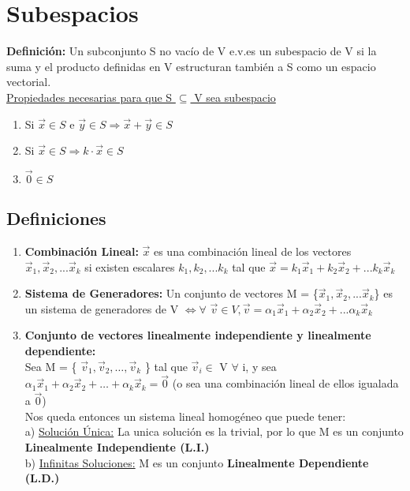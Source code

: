 \documentclass[11pt]{article}
\begin{document}
\section{Subespacios} 
{\bfseries Definición:} Un subconjunto S no vacío de V e.v.es un subespacio de V si la suma y el producto definidas en  V estructuran también a S como un espacio vectorial. \\
\underline {Propiedades necesarias para que S $\subseteq$ V sea subespacio}
\begin{enumerate}
\item Si $\vec{x} \in S$ e $\vec{y} \in S \Rightarrow \vec{x} + \vec{y} \in S$
\item Si $\vec{x} \in S \Rightarrow k \cdot \vec{x} \in S$
\item $\vec{0} \in S$
\end{enumerate}
\subsection{Definiciones}
\begin{enumerate}
\item {\bfseries Combinación Lineal:} $\vec{x}$ es una combinación lineal de los vectores $\vec{x}_{1}, \vec{x}_2,... \vec{x}_k $ si existen escalares $k_{1}, k_{2},... k_{k} $ tal que $\vec{x} = k_{1}\vec{x}_{1} + k_{2}\vec{x}_{2} +... k_{k}\vec{x}_{k}$
\item {\bfseries Sistema de Generadores:} Un conjunto de vectores M = \{$\vec{x}_{1}, \vec{x}_2,... \vec{x}_k $\} es un sistema de generadores de V $\Leftrightarrow \forall $ $ \vec{v} \in V, \vec{v} = \alpha_{1}\vec{x}_{1} + \alpha_{2}\vec{x}_{2} +... \alpha_{k}\vec{x}_{k}$
\item {\bfseries Conjunto de vectores linealmente independiente y linealmente dependiente:}\\
Sea M = \{ $\vec{v}_{1}, \vec{v}_2,\hdots, \vec{v}_k $ \} tal que $\vec{v}_{i} \in$ V $\forall $ i, y sea $\alpha_{1}\vec{x}_{1} + \alpha_{2}\vec{x}_{2} + \hdots + \alpha_{k}\vec{x}_{k} = \vec{0}$ (o sea una combinación lineal de ellos igualada a $\vec{0}$)\\
Nos queda entonces un sistema lineal homogéneo que puede tener:\\
a) \underline{Solución Única:} La unica solución es la trivial, por lo que M es un conjunto {\bfseries Linealmente Independiente (L.I.)}\\
b) \underline{Infinitas Soluciones:} M es un conjunto {\bfseries Linealmente Dependiente (L.D.)}
\end{enumerate}
\newpage
\end{document}

